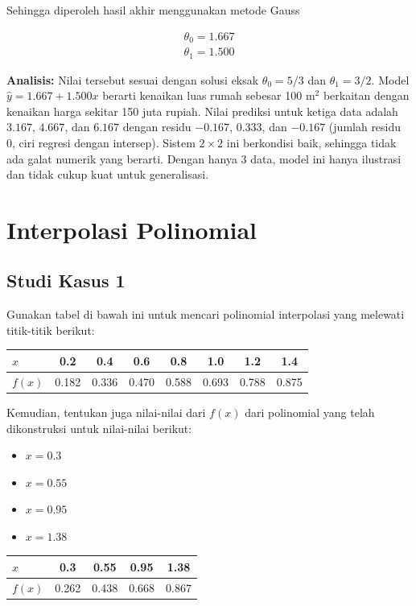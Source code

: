 \documentclass[12pt,a4paper]{report}
\begin{document}
Sehingga diperoleh hasil akhir menggunakan metode Gauss

\begin{align*}
\theta_0 = 1.667 \\
\theta_1 = 1.500
\end{align*}

\textbf{Analisis:} Nilai tersebut sesuai dengan solusi eksak $\theta_0=5/3$ dan $\theta_1=3/2$. Model $\hat{y}=1.667+1.500x$ berarti kenaikan luas rumah sebesar 100 m$^2$ berkaitan dengan kenaikan harga sekitar 150 juta rupiah. Nilai prediksi untuk ketiga data adalah $3.167$, $4.667$, dan $6.167$ dengan residu $-0.167$, $0.333$, dan $-0.167$ (jumlah residu 0, ciri regresi dengan intersep). Sistem $2\times2$ ini berkondisi baik, sehingga tidak ada galat numerik yang berarti. Dengan hanya 3 data, model ini hanya ilustrasi dan tidak cukup kuat untuk generalisasi.

\section{Interpolasi Polinomial}

\subsection{Studi Kasus 1}

Gunakan tabel di bawah ini untuk mencari polinomial interpolasi yang melewati titik-titik berikut:

\begin{center}
\begin{tabular}{|l|ccccccc|}
    \hline
    $x$    & 0.2   & 0.4   & 0.6   & 0.8   & 1.0   & 1.2   & 1.4   \\
    \hline
    $f(x)$ & 0.182 & 0.336 & 0.470 & 0.588 & 0.693 & 0.788 & 0.875 \\
    \hline
\end{tabular}
\end{center}

Kemudian, tentukan juga nilai-nilai dari $f(x)$ dari polinomial yang telah dikonstruksi untuk nilai-nilai berikut:

\begin{itemize}
    \item $x = 0.3$
    \item $x = 0.55$
    \item $x = 0.95$
    \item $x = 1.38$
\end{itemize}
\begin{center}
\begin{tabular}{|l|cccc|}
    \hline
    $x$    & 0.3  & 0.55   & 0.95   & 1.38   \\
    \hline
    $f(x)$ & 0.262 & 0.438 & 0.668 & 0.867 \\
    \hline
\end{tabular}
\end{center}
\end{document}
